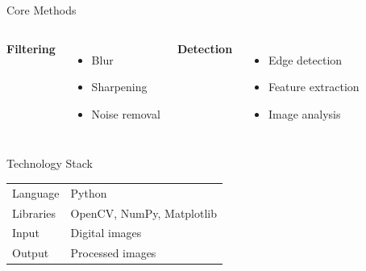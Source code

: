 \documentclass{beamer}
\begin{document}
\begin{frame}{Core Methods}


    \begin{columns}



        \textbf{Filtering}

        \begin{itemize}

            \item Blur

            \item Sharpening

            \item Noise removal

        \end{itemize}




        \textbf{Detection}

        \begin{itemize}

            \item Edge detection

            \item Feature extraction

            \item Image analysis

        \end{itemize}


    \end{columns}


\end{frame}





\begin{frame}{Technology Stack}


    \begin{tabular}{ll}

        Language  & Python                    \\

        Libraries & OpenCV, NumPy, Matplotlib \\

        Input     & Digital images            \\

        Output    & Processed images          \\
    \end{tabular}


\end{frame}
\end{document}
